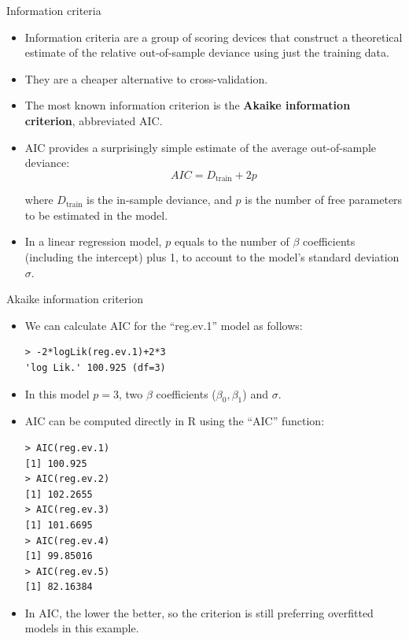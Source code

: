 \documentclass[handout]{beamer}
\begin{document}
\begin{frame}{Information criteria}
\scriptsize{

\begin{itemize}
\item Information criteria are a group of scoring devices that construct a theoretical estimate of the relative out-of-sample deviance using just the training data.
\item They are a cheaper alternative to cross-validation.

\item The most known information criterion is the \textbf{Akaike information criterion}, abbreviated AIC. 
\item AIC provides a surprisingly simple estimate of the average out-of-sample deviance:
\begin{equation}
AIC = D_{\text{train}} + 2p 
\end{equation}


where  $D_{\text{train}}$ is the in-sample deviance, and $p$ is the number of free parameters to be estimated in the model.

\item In a linear regression model, $p$ equals to the number of $\beta$ coefficients (including the intercept)  plus 1, to account to the model's standard deviation $\sigma$.


\end{itemize}


} 
\end{frame}


\begin{frame}[fragile]{Akaike information criterion}
\scriptsize{

\begin{itemize}
\item We can calculate AIC for the ``reg.ev.1'' model as follows:

\begin{verbatim}
> -2*logLik(reg.ev.1)+2*3
'log Lik.' 100.925 (df=3) 
\end{verbatim}

\item In this model $p=3$, two $\beta$ coefficients ($\beta_0,\beta_1$) and $\sigma$.

\item AIC can be computed directly in R using the ``AIC'' function:

\begin{verbatim}
> AIC(reg.ev.1)
[1] 100.925
> AIC(reg.ev.2)
[1] 102.2655
> AIC(reg.ev.3)
[1] 101.6695
> AIC(reg.ev.4)
[1] 99.85016
> AIC(reg.ev.5)
[1] 82.16384 
\end{verbatim}

\item In AIC, the lower the better, so the criterion is still preferring overfitted models in this example.


\end{itemize}


} 
\end{frame}
\end{document}
